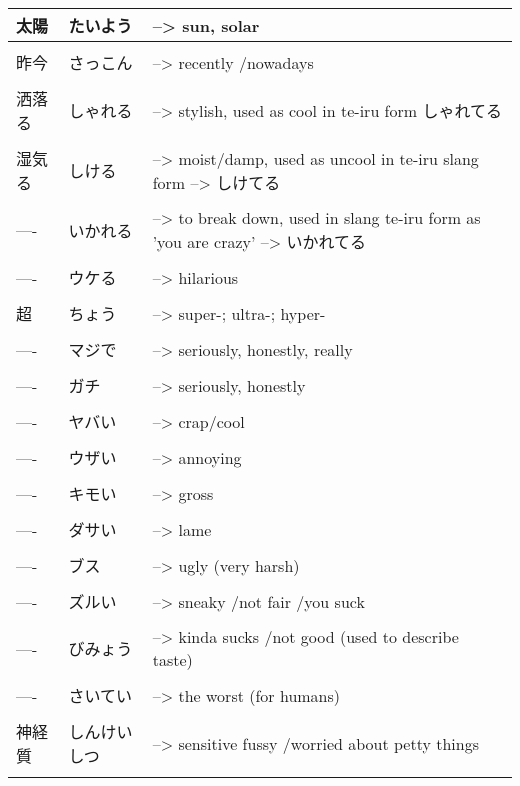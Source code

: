 \documentclass{article}
\begin{document}
\begin{tabular}{ l | l p{14cm}  }
太陽 & たいよう &--> sun, solar \\ \hline\\[-1em]
昨今 & さっこん &--> recently /nowadays \\ \hline\\[-1em]
洒落る & しゃれる &--> stylish, used as cool in te-iru form しゃれてる \\ \hline\\[-1em]
湿気る & しける &--> moist/damp, used as uncool in te-iru slang form --> しけてる \\ \hline\\[-1em]
---- & いかれる &--> to break down, used in slang te-iru form as 'you are crazy' --> いかれてる \\ \hline\\[-1em]
---- & ウケる　&--> hilarious \\ \hline\\[-1em]
超 & ちょう &--> super-; ultra-; hyper- \\ \hline\\[-1em]
---- & マジで &--> seriously, honestly, really \\ \hline\\[-1em]
---- & ガチ &--> seriously, honestly \\ \hline\\[-1em]
---- & ヤバい &--> crap/cool \\ \hline\\[-1em]
---- & ウザい &--> annoying \\ \hline\\[-1em]
---- & キモい &--> gross \\ \hline\\[-1em]
---- & ダサい &--> lame \\ \hline\\[-1em]
---- & ブス &--> ugly (very harsh) \\ \hline\\[-1em]
---- & ズルい &--> sneaky /not fair /you suck \\ \hline\\[-1em]
---- & びみょう &--> kinda sucks /not good (used to describe taste) \\ \hline\\[-1em]
---- & さいてい &--> the worst (for humans) \\ \hline\\[-1em]
神経質 & しんけいしつ &--> sensitive fussy /worried about petty things \\ \hline\\[-1em]

\end{tabular}
\end{document}
